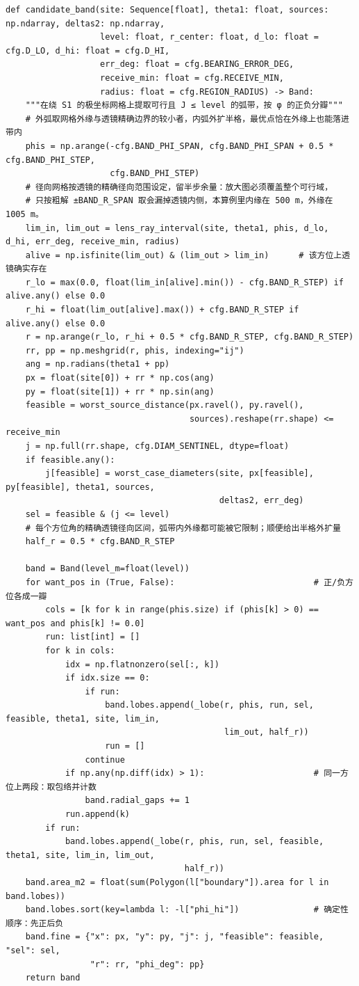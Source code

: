 \documentclass[UTF8, zihao=5,AutoFakeBold=2]{ctexart}
\begin{document}
\begin{lstlisting}
def candidate_band(site: Sequence[float], theta1: float, sources: np.ndarray, deltas2: np.ndarray,
                   level: float, r_center: float, d_lo: float = cfg.D_LO, d_hi: float = cfg.D_HI,
                   err_deg: float = cfg.BEARING_ERROR_DEG,
                   receive_min: float = cfg.RECEIVE_MIN,
                   radius: float = cfg.REGION_RADIUS) -> Band:
    """在绕 S1 的极坐标网格上提取可行且 J ≤ level 的弧带，按 φ 的正负分瓣"""
    # 外弧取网格外缘与透镜精确边界的较小者，内弧外扩半格，最优点恰在外缘上也能落进带内
    phis = np.arange(-cfg.BAND_PHI_SPAN, cfg.BAND_PHI_SPAN + 0.5 * cfg.BAND_PHI_STEP,
                     cfg.BAND_PHI_STEP)
    # 径向网格按透镜的精确径向范围设定，留半步余量：放大图必须覆盖整个可行域，
    # 只按粗解 ±BAND_R_SPAN 取会漏掉透镜内侧，本算例里内缘在 500 m，外缘在 1005 m。
    lim_in, lim_out = lens_ray_interval(site, theta1, phis, d_lo, d_hi, err_deg, receive_min, radius)
    alive = np.isfinite(lim_out) & (lim_out > lim_in)      # 该方位上透镜确实存在
    r_lo = max(0.0, float(lim_in[alive].min()) - cfg.BAND_R_STEP) if alive.any() else 0.0
    r_hi = float(lim_out[alive].max()) + cfg.BAND_R_STEP if alive.any() else 0.0
    r = np.arange(r_lo, r_hi + 0.5 * cfg.BAND_R_STEP, cfg.BAND_R_STEP)
    rr, pp = np.meshgrid(r, phis, indexing="ij")
    ang = np.radians(theta1 + pp)
    px = float(site[0]) + rr * np.cos(ang)
    py = float(site[1]) + rr * np.sin(ang)
    feasible = worst_source_distance(px.ravel(), py.ravel(),
                                     sources).reshape(rr.shape) <= receive_min
    j = np.full(rr.shape, cfg.DIAM_SENTINEL, dtype=float)
    if feasible.any():
        j[feasible] = worst_case_diameters(site, px[feasible], py[feasible], theta1, sources,
                                           deltas2, err_deg)
    sel = feasible & (j <= level)
    # 每个方位角的精确透镜径向区间，弧带内外缘都可能被它限制；顺便给出半格外扩量
    half_r = 0.5 * cfg.BAND_R_STEP

    band = Band(level_m=float(level))
    for want_pos in (True, False):                            # 正/负方位各成一瓣
        cols = [k for k in range(phis.size) if (phis[k] > 0) == want_pos and phis[k] != 0.0]
        run: list[int] = []
        for k in cols:
            idx = np.flatnonzero(sel[:, k])
            if idx.size == 0:
                if run:
                    band.lobes.append(_lobe(r, phis, run, sel, feasible, theta1, site, lim_in,
                                            lim_out, half_r))
                    run = []
                continue
            if np.any(np.diff(idx) > 1):                      # 同一方位上两段：取包络并计数
                band.radial_gaps += 1
            run.append(k)
        if run:
            band.lobes.append(_lobe(r, phis, run, sel, feasible, theta1, site, lim_in, lim_out,
                                    half_r))
    band.area_m2 = float(sum(Polygon(l["boundary"]).area for l in band.lobes))
    band.lobes.sort(key=lambda l: -l["phi_hi"])               # 确定性顺序：先正后负
    band.fine = {"x": px, "y": py, "j": j, "feasible": feasible, "sel": sel,
                 "r": rr, "phi_deg": pp}
    return band


\end{lstlisting}
\end{document}
